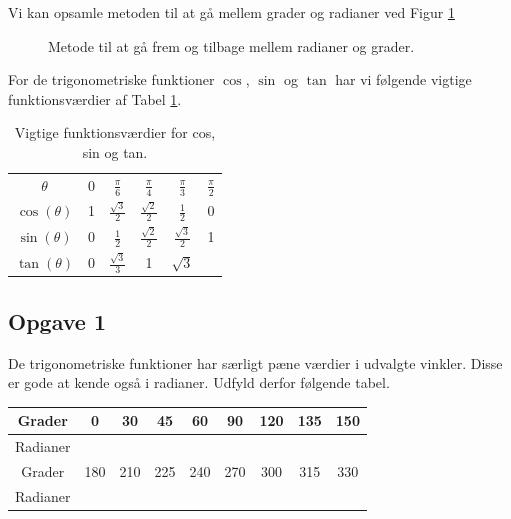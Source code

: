 Vi kan opsamle metoden til at gå mellem grader og radianer ved Figur \ref{fig:radiangrad}
\begin{figure}[H]
	\centering
	\label{fig:radiangrad}
	\caption{Metode til at gå frem og tilbage mellem radianer og grader.}
	\label{fig:radiangrad}
\end{figure}
For de trigonometriske funktioner $\cos$, $\sin$ og $\tan$ har vi følgende vigtige funktionsværdier af Tabel \ref{tab:trig}.
\begin{table}[H]
	\centering
	\begin{tabular}{cccccc}
		$\theta$ & 0 & $\frac{\pi}{6}$ & $\frac{\pi}{4}$ & $\frac{\pi}{3}$ & $\frac{\pi}{2}$ \\
		$\cos(\theta)$ & 1 &  $\frac{\sqrt{3}}{2}$ & $\frac{\sqrt{2}}{2}$ & $\frac{1}{2}$ & 0 \\
		$\sin(\theta)$ & 0 & $\frac{1}{2}$ & $\frac{\sqrt{2}}{2}$ &  $\frac{\sqrt{3}}{2}$ & 1 \\
		$\tan(\theta)$ & 0 &  $\frac{\sqrt{3}}{3}$ & 1 & $\sqrt{3}$ & 
	\end{tabular}
	\caption{Vigtige funktionsværdier for cos, sin og tan.}
	\label{tab:trig}
\end{table}

\subsection*{Opgave 1}
De trigonometriske funktioner har særligt pæne værdier i udvalgte vinkler. Disse er gode at kende også i radianer. 
Udfyld derfor følgende tabel.
\begin{table}[H]
	\centering
	
	\begin{tabular}{c|c|c|c|c|c|c|c|c}
		Grader & 0 & 30 & 45 & 60 & 90 & 120 & 135 & 150 \\
		\hline
		Radianer & & & & & & & &\\
		\hline 
		Grader & 180 & 210 & 225 & 240 & 270 & 300 & 315 & 330 \\
		\hline
		Radianer & & & & & & & &
	\end{tabular}
\end{table}

